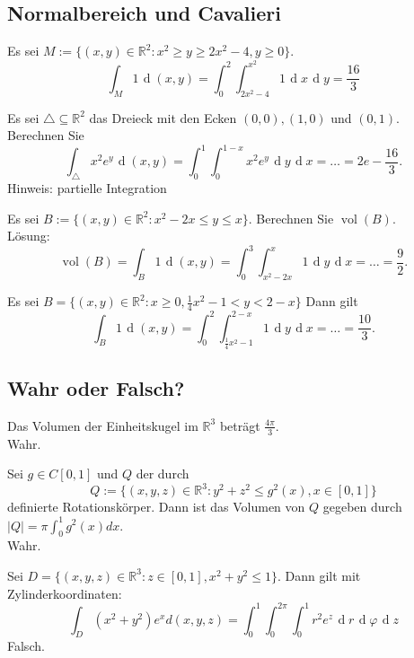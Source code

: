 \documentclass[parskip=full]{scrartcl}
\DeclareMathOperator{\diff}{\mathop{}\!\mathrm{d}}
\DeclareMathOperator{\vol}{vol}
\begin{document}
\subsection{Normalbereich und Cavalieri}
Es sei $M := \{(x,y) \in \mathbb{R}^2 : x^2 \geq y \geq 2x^2 - 4, y \geq 0\}$.
\begin{displaymath}
  \int_M 1 \diff (x,y) = \int_0^2 \int_{2x^2 - 4}^{x^2} 1 \diff x \diff y = \frac{16}{3}
\end{displaymath}

Es sei $\triangle \subseteq \mathbb{R}^2$ das Dreieck mit den Ecken $(0,0), (1,0)$ und $(0,1)$.
Berechnen Sie
\begin{displaymath}
  \int_{\triangle} x^2e^y \diff (x,y) = \int_0^1 \int_0^{1 - x} x^2 e^y \diff y \diff x = \dots = 2e - \frac{16}{3}.
\end{displaymath}
Hinweis: partielle Integration

Es sei $B := \{(x,y) \in \mathbb{R}^2 : x^2 - 2x \leq y \leq x\}$.
Berechnen Sie $\vol(B)$.\\
Lösung:
\begin{displaymath}
  \vol(B) = \int_B 1 \diff(x,y) = \int_0^3 \int_{x^2 - 2x}^{x} 1 \diff y \diff x = \dots = \frac{9}{2}.
\end{displaymath}

Es sei $B = \{(x,y) \in \mathbb{R}^2 : x \geq 0, \frac{1}{4}x^2 - 1 < y < 2 - x\}$
Dann gilt
\begin{displaymath}
  \int_B 1 \diff(x,y) = \int_0^2 \int_{\frac{1}{4}x^2 - 1}^{2 - x} 1 \diff y \diff x = \dots = \frac{10}{3}.
\end{displaymath}

\subsection{Wahr oder Falsch?}
Das Volumen der Einheitskugel im $\mathbb{R}^3$ beträgt $\frac{4\pi}{3}$.\\
Wahr.

Sei $g \in C[0,1]$ und $Q$ der durch
\begin{displaymath}
  Q := \{(x,y,z) \in \mathbb{R}^3 : y^2 + z^2 \leq g^2(x), x \in [0,1]\}
\end{displaymath}
definierte Rotationskörper.
Dann ist das Volumen von $Q$ gegeben durch $|Q| = \pi \int_{0}^{1} g^2(x)dx$.\\
Wahr.

Sei $D = \{(x,y,z) \in \mathbb{R}^3 : z \in [0,1], x^2 + y^2 \leq 1\}$.
Dann gilt mit Zylinderkoordinaten:
\begin{displaymath}
  \int_D (x^2 + y^2)e^x d(x,y,z) = \int_0^1 \int_0^{2\pi} \int_0^1 r^2 e^z \diff r \diff \varphi \diff z
\end{displaymath}
Falsch.
\end{document}
